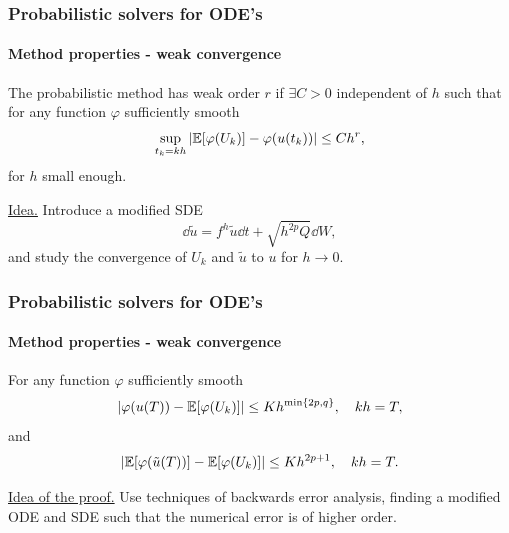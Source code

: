 \documentclass{beamer}
\newcommand{\E}{\mathbb{E}}
\renewcommand{\phi}{\varphi}
\begin{document}
\begin{frame}
	\frametitle{Probabilistic solvers for ODE's}
	\framesubtitle{Method properties - weak convergence \cite{CGS16}}

	\begin{definition} The probabilistic method has weak order $r$ if $\exists C > 0$ independent of $h$ such that for any function $\phi$ sufficiently smooth
		\begin{equation*}
		\sup_{t_k = kh} \abs{\E[\phi(U_k)] - \phi(u(t_k))} \leq Ch^r,
		\end{equation*}
		for $h$ small enough.
	\end{definition}
	
	\underline{Idea.} Introduce a modified SDE 
	\begin{equation*}
		\dd{\tilde u} = f^h{\tilde u}\dd{t} + \sqrt{h^{2p} Q} \dd{W},
	\end{equation*}
	and study the convergence of $U_k$ and $\tilde u$ to $u$ for $h \to 0$.
\end{frame}

\begin{frame}
	\frametitle{Probabilistic solvers for ODE's}
	\framesubtitle{Method properties - weak convergence \cite{CGS16}}

	\begin{theorem} For any function $\phi$ sufficiently smooth
		\begin{equation*}
		\abs{\phi(u(T)) - \E[\phi(U_k)]} \leq Kh^{\min\{2p, q\}}, \quad kh = T,
		\end{equation*}
		and 
		\begin{equation*}
		\abs{\E[\phi(\tilde u(T))] - \E[\phi(U_k)]} \leq Kh^{2p + 1}, \quad kh = T.
		\end{equation*}
	\end{theorem}
	
	\underline{Idea of the proof.} Use techniques of backwards error analysis, finding a modified ODE and SDE such that the numerical error is of higher order.
	
\end{frame}

\end{document}
